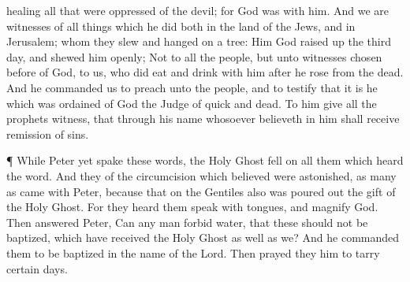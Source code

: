 {healing
all
that were
oppressed
of the
devil;
for
God
was
with
him.
And
we
are
witnesses of all
things
which he
did
both
in the
land of the
Jews,
and
in
Jerusalem;
whom they
slew and
hanged
on a
tree:
Him
God raised
up the
third
day,
and
shewed
him
openly;
Not to
all the
people,
but unto
witnesses chosen
before
of
God,
{} to
us,
who did
eat
and drink
with
him
after
he
rose
from the
dead.
And he
commanded
us to
preach unto the
people,
and to
testify
that
it
is he
which was
ordained
of
God
{} the
Judge of
quick
and
dead.
To
him
give
all the
prophets
witness, that
through
his
name
whosoever
believeth
in
him shall
receive
remission of
sins.
\par }{\PP {}¶ While
Peter
yet
spake
these
words, the
Holy
Ghost
fell
on
all
them which
heard the
word.
And
they
of the
circumcision which
believed were
astonished, as many
as
came with
Peter, because
that
on the
Gentiles
also was poured
out the
gift of the
Holy
Ghost.
For they
heard
them
speak with
tongues,
and
magnify
God.
Then
answered
Peter,
Can any
man
forbid
water,
that
these
should
not be
baptized,
which have
received the
Holy
Ghost as
well
as
we?
And he
commanded
them to be
baptized
in the
name of the
Lord.
Then prayed
they
him to
tarry
certain
days.

}
